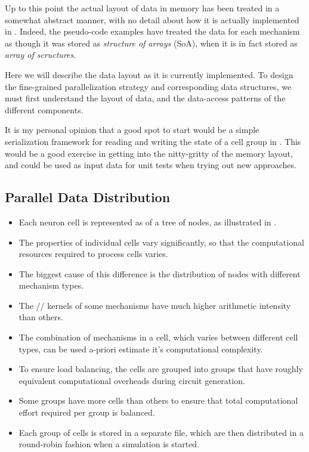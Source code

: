 Up to this point the actual layout of data in memory has been treated in a somewhat abstract manner, with no detail about how it is actually implemented in \neuron. Indeed, the pseudo-code examples have treated the data for each mechanism as though it was stored as \emph{structure of arrays} (SoA), when it is in fact stored as \emph{array of scructures}.

Here we will describe the data layout as it is currently implemented. To design the fine-grained parallelization strategy and corresponding data structures, we must first understand the layout of data, and the data-access patterns of the different components.

\begin{note}
It is my personal opinion that a good spot to start would be a simple serialization framework for reading and writing the state of a cell group in \neuron. This would be a good exercise in getting into the nitty-gritty of the memory layout, and could be used as input data for unit tests when trying out new approaches.
\end{note}

\subsection{Parallel Data Distribution}

\begin{itemize}
\item
    Each neuron cell is represented as of a tree of nodes, as illustrated in .
\item
    The properties of individual cells vary significantly, so that the computational resources required to process cells varies.
\item
    The biggest cause of this difference is the distribution of nodes with different mechanism types.
\item
    The // kernels of some mechanisms have much higher arithmetic intensity than others.
\item
    The combination of mechanisms in a cell, which varies between different cell types, can be used a-priori estimate it's computational complexity.
\end{itemize}

\begin{itemize}
\item
    To ensure load balancing, the cells are grouped into groups that have roughly equivalent computational overheads during circuit generation.
\item
    Some groups have more cells than others to ensure that total computational effort required per group is balanced.
\item
    Each group of cells is stored in a separate  file, which are then distributed in a round-robin fashion when a \neuron simulation is started.
\end{itemize}

